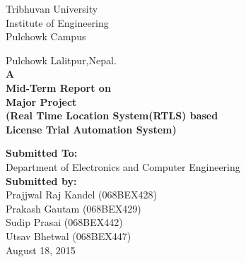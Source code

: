 \begin{titlepage}
	\begin{center}
		\begin{Huge}
			Tribhuvan University\\
			Institute of Engineering\\
			 Pulchowk Campus\\
		\end{Huge}
			Pulchowk Lalitpur,Nepal.\\
			\vfill
		\textbf{
					A\\
					Mid-Term Report on\\
					Major Project\\
					(Real Time Location System(RTLS) based\\
					License Trial Automation System)\\
				}
		\vfill

		\textbf{Submitted To:\\}
			Department of Electronics and Computer Engineering\\[2cm]
		\textbf{Submitted by:\\}
			Prajjwal Raj Kandel (068BEX428)\\
			Prakash Gautam (068BEX429)\\
			Sudip Prasai (068BEX442)\\
			Utsav Bhetwal (068BEX447)\\
			\vfill
			August 18, 2015
	\end{center}
\end{titlepage}
